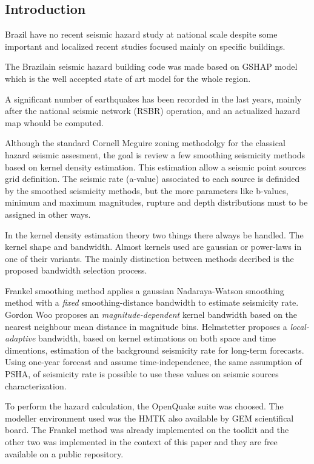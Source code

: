 \documentclass[draft,grl]{AGUTeX}
\begin{document}
\begin{article}

\section{Introduction}

Brazil have no recent seismic hazard study at national scale despite some important and localized recent studies
focused mainly on specific buildings.

The Brazilain seismic hazard building code was made based on GSHAP model which is the well accepted state of art model
for the whole region.

A significant number of earthquakes has been recorded in the last years, mainly after the national seismic network
(RSBR) operation, and an actualized hazard map whould be computed.

Although the standard Cornell Mcguire zoning methodolgy for the classical hazard seismic assesment, the goal is
review a few smoothing seismicity methods based on kernel density estimation. This estimation allow a seismic point
sources grid definition. The seismic rate (a-value) associated to each source is definided by the smoothed seismicity
methods, but the more parameters like b-values, minimum and maximum magnitudes, rupture and depth
distributions must to be assigned in other ways.

In the kernel density estimation theory two things there always be handled. The kernel shape and bandwidth.
Almost kernels used are gaussian or power-laws in one of their variants. The mainly distinction between methods decribed
is the proposed bandwidth selection process. 

Frankel smoothing method applies a gaussian Nadaraya-Watson smoothing method with a \emph{fixed}
smoothing-distance bandwidth to estimate seismicity rate. Gordon Woo proposes an \emph{magnitude-dependent} kernel
bandwidth based on the nearest neighbour mean distance in magnitude bins. Helmstetter proposes a \emph{local-adaptive}
bandwidth, based on kernel estimations on both space and time dimentions, estimation of the background seismicity rate
for long-term forecasts. Using one-year forecast and assume time-independence, the same assumption of PSHA, of
seismicity rate is possible to use these values on seismic sources characterization.

To perform the hazard calculation, the OpenQuake suite was choosed. The modeller environment used was the HMTK also
available by GEM scientifical board. The Frankel method was already implemented on the toolkit and the other two was
implemented in the context of this paper and they are free available on a public repository.


\end{article}
\end{document}
